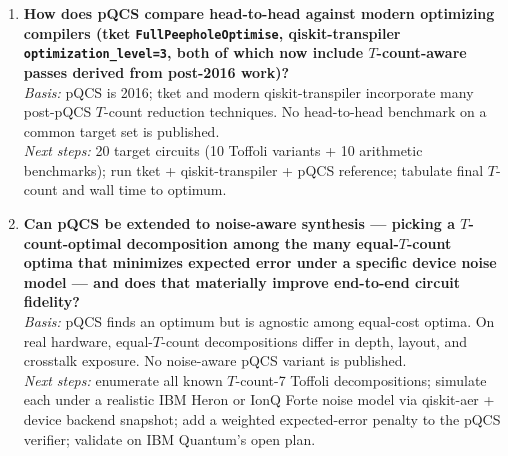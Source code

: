 \begin{enumerate}
\item \textbf{How does pQCS compare head-to-head against modern
optimizing compilers (tket \texttt{FullPeepholeOptimise},
qiskit-transpiler \texttt{optimization\_level=3}, both of which now
include $T$-count-aware passes derived from post-2016 work)?}\\
\emph{Basis:} pQCS is 2016; tket and modern qiskit-transpiler
incorporate many post-pQCS $T$-count reduction techniques. No
head-to-head benchmark on a common target set is published.\\
\emph{Next steps:} 20 target circuits (10 Toffoli variants + 10
arithmetic benchmarks); run tket + qiskit-transpiler + pQCS reference;
tabulate final $T$-count and wall time to optimum.

\item \textbf{Can pQCS be extended to noise-aware synthesis --- picking
a $T$-count-optimal decomposition among the many equal-$T$-count
optima that minimizes expected error under a specific device noise
model --- and does that materially improve end-to-end circuit
fidelity?}\\
\emph{Basis:} pQCS finds an optimum but is agnostic among equal-cost
optima. On real hardware, equal-$T$-count decompositions differ in
depth, layout, and crosstalk exposure. No noise-aware pQCS variant is
published.\\
\emph{Next steps:} enumerate all known $T$-count-7 Toffoli
decompositions; simulate each under a realistic IBM Heron or IonQ Forte
noise model via qiskit-aer + device backend snapshot; add a weighted
expected-error penalty to the pQCS verifier; validate on IBM Quantum's
open plan.
\end{enumerate}
